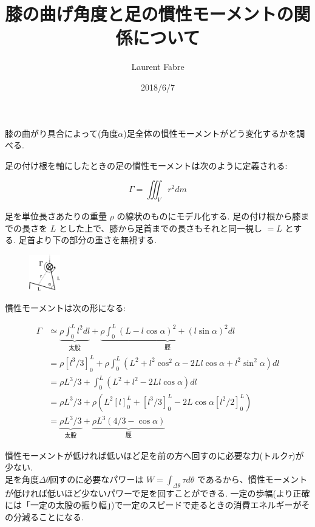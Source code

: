 \documentclass[11pt]{article}
\begin{document}
\title{膝の曲げ角度と足の慣性モーメントの関係について}
\date{2018/6/7}
\author{Laurent Fabre}

\maketitle

膝の曲がり具合によって(角度$\alpha$)足全体の慣性モーメントがどう変化するかを調べる.

足の付け根を軸にしたときの足の慣性モーメントは次のように定義される:

\begin{equation}
\Gamma = \iiint_V r^2 dm
\end{equation}

足を単位長さあたりの重量 $\rho$ の線状のものにモデル化する.
足の付け根から膝までの長さを $L$ とした上で、膝から足首までの長さもそれと同一視し $=L$ とする. 足首より下の部分の重さを無視する.

\begin{figure}[h!]
\centering
\includegraphics[width=0.12\textwidth]{leg_model.eps}
\end{figure}
慣性モーメントは次の形になる:

\begin{equation}
\begin{split}
\Gamma & \simeq \underbrace{\rho\int_0^L l^2 dl}_{太股} + \underbrace{\rho\int_0^L (L - l\cos\alpha)^2 + (l\sin\alpha)^2 dl}_{脛}\\
 & = \rho\left[l^3/3\right]_0^L + \rho\int_0^L (L^2 + l^2\cos^2\alpha - 2Ll\cos\alpha + l^2\sin^2\alpha) dl\\
 & = \rho L^3/3 + \int_0^L (L^2 + l^2 - 2Ll\cos\alpha) dl\\
 & = \rho L^3/3 + \rho\left(L^2\left[l\right]_0^L + \left[l^3/3\right]_0^L - 2L\cos\alpha\left[l^2/2\right]_0^L \right)\\
 & = \underbrace{\rho L^3/3}_{太股} + \underbrace{\rho L^3\left(4/3 - \cos\alpha  \right)}_{脛}
\end{split}
\end{equation}

慣性モーメントが低ければ低いほど足を前の方へ回すのに必要な力(トルク$\tau$)が少ない.\\
足を角度$\Delta\theta$回すのに必要なパワーは $W=\int_{\Delta\theta}\tau d\theta$ であるから、慣性モーメントが低ければ低いほど少ないパワーで足を回すことができる.
一定の歩幅(より正確には「一定の太股の振り幅」)で一定のスピードで走るときの消費エネルギーがその分減ることになる.
\\
\end{document}
